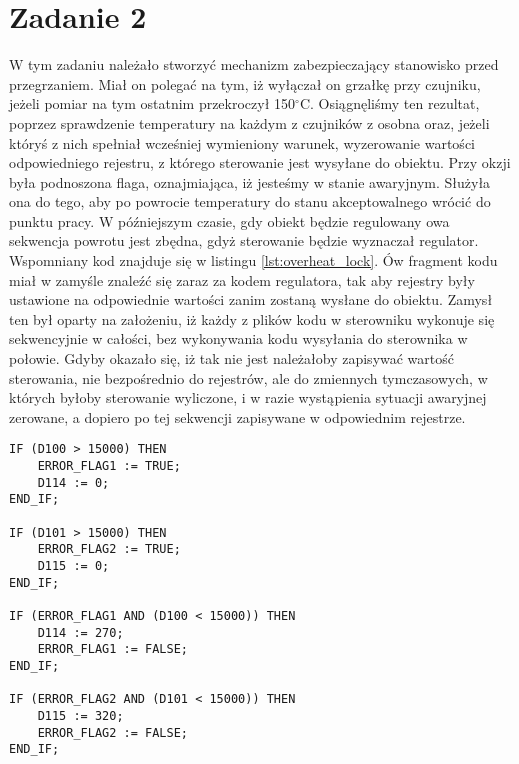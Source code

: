 \chapter{Zadanie 2}
W tym zadaniu należało stworzyć mechanizm zabezpieczający stanowisko przed przegrzaniem.
Miał on polegać na tym, iż wyłączał on grzałkę przy czujniku, jeżeli
pomiar na tym ostatnim przekroczył 150$^\circ$C. Osiągnęliśmy ten rezultat,
poprzez sprawdzenie temperatury na każdym z czujników z osobna oraz,
jeżeli któryś z nich spełniał wcześniej wymieniony warunek, wyzerowanie
wartości odpowiedniego rejestru, z którego sterowanie jest wysyłane do
obiektu. Przy okzji była podnoszona flaga, oznajmiająca, iż jesteśmy w stanie
awaryjnym. Służyła ona do tego, aby po powrocie temperatury do stanu akceptowalnego
wrócić do punktu pracy. W późniejszym czasie, gdy obiekt będzie regulowany
owa sekwencja powrotu jest zbędna, gdyż sterowanie będzie wyznaczał regulator.
Wspomniany kod znajduje się w listingu \ref{lst:overheat_lock}. Ów fragment
kodu miał w zamyśle znaleźć się zaraz za kodem regulatora, tak aby rejestry
były ustawione na odpowiednie wartości zanim zostaną wysłane do obiektu.
Zamysł ten był oparty na założeniu, iż każdy z plików kodu w sterowniku
wykonuje się sekwencyjnie w całości, bez wykonywania kodu wysyłania do sterownika w połowie.
Gdyby okazało się, iż tak nie jest należałoby zapisywać wartość sterowania, nie bezpośrednio
do rejestrów, ale do zmiennych tymczasowych, w których byłoby sterowanie wyliczone,
i w razie wystąpienia sytuacji awaryjnej zerowane, a dopiero po tej sekwencji
zapisywane w odpowiednim rejestrze.

\begin{lstlisting}[style=customlatex,frame=single, caption=Kod mechanizmu zabezpieczającego przed przegrzaniem, label=lst:overheat_lock]
IF (D100 > 15000) THEN
	ERROR_FLAG1 := TRUE;
	D114 := 0;
END_IF;

IF (D101 > 15000) THEN
	ERROR_FLAG2 := TRUE;
	D115 := 0;
END_IF;

IF (ERROR_FLAG1 AND (D100 < 15000)) THEN
	D114 := 270;
	ERROR_FLAG1 := FALSE;
END_IF;

IF (ERROR_FLAG2 AND (D101 < 15000)) THEN
	D115 := 320;
	ERROR_FLAG2 := FALSE;
END_IF;
\end{lstlisting}

